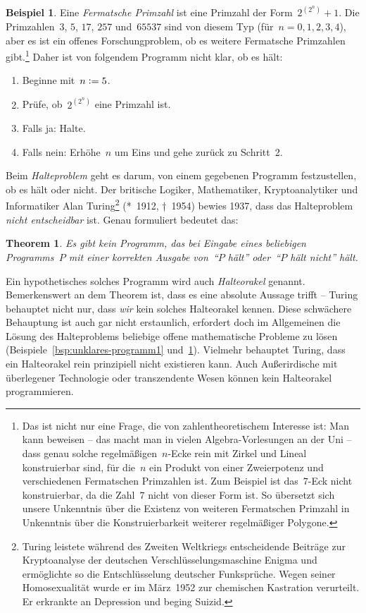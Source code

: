 \documentclass[twoside]{../zirkelblatt1415}
\theoremstyle{definition}
\newtheorem{bsp}[defn]{Beispiel}
\theoremstyle{plain}
\newtheorem{thm}[defn]{Theorem}
\theoremstyle{remark}
\newenvironment{listing}{
  \renewcommand*\theenumi{\arabic{enumi}}
  \renewcommand{\labelenumi}{\theenumi.}
  \begin{enumerate}\itemsep0em}{\end{enumerate}}
\newcommand{\defeq}{\vcentcolon=}
\begin{document}
\begin{bsp}\label{bsp:unklares-programm2}Eine \emph{Fermatsche Primzahl} ist eine Primzahl der
Form~$2^{(2^n)} + 1$. Die Primzahlen~$3$, $5$, $17$, $257$ und~$65537$ sind von
diesem Typ (für~$n = 0,1,2,3,4$), aber es ist ein offenes Forschungproblem, ob
es weitere Fermatsche Primzahlen gibt.\footnote{Das ist nicht nur eine Frage,
die von zahlentheoretischem Interesse ist: Man kann beweisen -- das macht man
in vielen Algebra-Vorlesungen an der Uni -- dass genau solche
regelmäßigen~$n$-Ecke rein mit Zirkel und Lineal konstruierbar sind, für die~$n$ ein
Produkt von einer Zweierpotenz und verschiedenen Fermatschen Primzahlen ist.
Zum Beispiel ist das~$7$-Eck nicht konstruierbar, da die Zahl~$7$ nicht von
dieser Form ist. So übersetzt sich unsere Unkenntnis über die Existenz von
weiteren Fermatschen Primzahl in Unkenntnis über die Konstruierbarkeit weiterer
regelmäßiger Polygone.}
Daher ist von folgendem Programm nicht
klar, ob es hält:
\begin{listing}
\item[1.] Beginne mit~$n \defeq 5$.
\item[2.] Prüfe, ob~$2^{(2^n)}$ eine Primzahl ist.
\item[3.] Falls ja: Halte.
\item[4.] Falls nein: Erhöhe~$n$ um Eins und gehe zurück zu Schritt~2.
\end{listing}
\end{bsp}

Beim \emph{Halteproblem} geht es darum, von einem gegebenen Programm
festzustellen, ob es hält oder nicht. Der britische Logiker, Mathematiker,
Kryptoanalytiker und Informatiker Alan Turing\footnote{Turing leistete während des
Zweiten Weltkriegs entscheidende Beiträge zur Kryptoanalyse der
deutschen Verschlüsselungsmaschine Enigma und ermöglichte so die
Entschlüsselung deutscher Funksprüche. Wegen seiner Homosexualität wurde er
im März~1952 zur chemischen Kastration verurteilt. Er erkrankte an
Depression und beging Suizid.} (*~1912, †~1954) bewies 1937, dass das Halteproblem
\emph{nicht entscheidbar} ist. Genau formuliert bedeutet das:

\begin{thm}Es gibt kein Programm, das bei Eingabe eines beliebigen Programms~$P$ mit einer
korrekten Ausgabe von~"`$P$ hält"' oder~"`$P$ hält nicht"' hält.\end{thm}

\enlargethispage{2em}

Ein hypothetisches solches Programm wird auch \emph{Halteorakel} genannt.
Bemerkenswert an dem Theorem ist, dass es eine absolute Aussage trifft --
Turing behauptet nicht nur, dass \emph{wir} kein solches Halteorakel kennen.
Diese schwächere Behauptung ist auch gar nicht erstaunlich, erfordert doch im
Allgemeinen die Lösung des Halteproblems beliebige offene mathematische
Probleme zu lösen (Beispiele~\ref{bsp:unklares-programm1} und~\ref{bsp:unklares-programm2}).
Vielmehr behauptet Turing, dass ein Halteorakel rein prinzipiell nicht
existieren kann. Auch Außerirdische mit überlegener Technologie oder
transzendente Wesen können kein Halteorakel programmieren.
\end{document}
